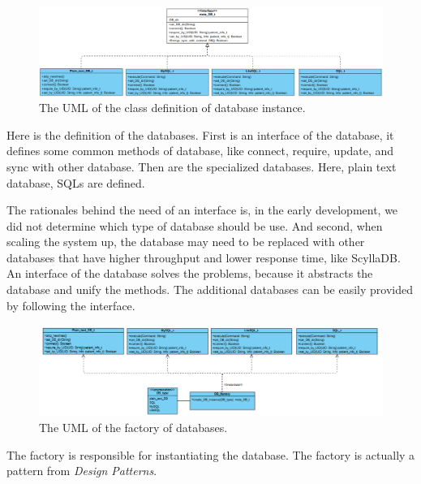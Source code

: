 \documentclass{article}
\begin{document}
  \begin{figure}[h]
    \centering
    \includegraphics[scale = 0.5]{asset/database/database_instance.png}
    \caption{The UML of the class definition of database instance.}
    \label{fig:DB_instance}
  \end{figure}
  Here is the definition of the databases. First is an interface of the 
  database, it defines some common methods of database, like connect, require, 
  update, and sync with other database. 
  Then are the specialized databases. Here, plain text database, SQLs are defined. 

  The rationales behind the need of an interface is, in the early development, 
  we did not determine which type of database should be use. And second, when 
  scaling the system up, the database may need to be replaced with other databases 
  that have higher throughput and lower response time, like ScyllaDB. 
  An interface of the database solves the problems, because it abstracts the 
  database and unify the methods. The additional databases can be easily provided 
  by following the interface. 

  \begin{figure}[h]
    \centering
    \includegraphics[scale = 0.7]{asset/database/factory_UML.png}
    \caption{The UML of the factory of databases.}
    \label{fig:factory_UML}
  \end{figure}
  The factory is responsible for instantiating the database. The factory is actually 
  a pattern from \textit{Design Patterns}. 
\end{document}
